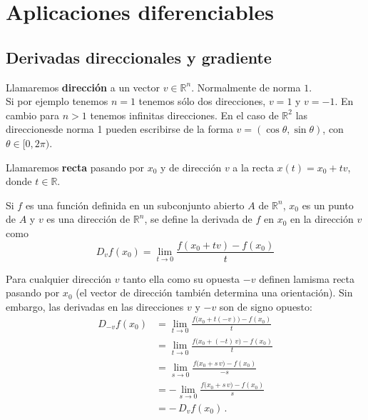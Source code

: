 \section{Aplicaciones diferenciables}
\subsection{Derivadas direccionales y gradiente}
\begin{definición}[Dirección]
    Llamaremos \textbf{dirección} a un vector $v\in\mathbb{R}^n$. Normalmente de norma $1$. \\
    Si por ejemplo tenemos $n = 1$ tenemos sólo dos direcciones, $v = 1$ y $v = -1$. En cambio para $n > 1$ tenemos infinitas direcciones. En el caso de $\mathbb{R}^2$ las direccionesde norma 1 pueden escribirse de la forma $v = (\cos\theta, \sin\theta)$, con $\theta\in[0,2\pi)$. \\
\end{definición}

\begin{definición}[Recta]
    Llamaremos \textbf{recta} pasando por $x_0$ y de dirección $v$ a la recta $x(t) = x_0 + tv$, donde $t\in\mathbb{R}$. 
\end{definición}

\begin{definición}
    Si $f$ es una función definida en un subconjunto abierto $A$ de $\mathbb{R}^n$, $x_0$ es un punto de $A$ y $v$ es una dirección de $\mathbb{R}^n$, se define la derivada de $f$ en $x_0$ en la dirección $v$ como
    $$ D_vf(x_0) = \lim_{t\to 0} \frac{f(x_0 + tv) - f(x_0)}{t} $$
\end{definición}
\begin{observación}
    Para cualquier dirección $v$ tanto ella como su opuesta $-v$ definen lamisma recta pasando por $x_0$ (el vector de dirección también determina una orientación). Sin embargo, las derivadas en las direcciones $v$ y $-v$ son de signo opuesto: 
    \begin{align*}
        D_{-v}f(x_{0})
        &= \lim_{t \to 0} \frac{f\bigl(x_{0} + t(-v)\bigr) - f(x_{0})}{t} \\
        &= \lim_{t \to 0} \frac{f\bigl(x_{0} + (-t)\,v\bigr) - f(x_{0})}{t} \\
        &= \lim_{s \to 0} \frac{f\bigl(x_{0} + s\,v\bigr) - f(x_{0})}{-s} \\
        &= - \lim_{s \to 0} \frac{f\bigl(x_{0} + s\,v\bigr) - f(x_{0})}{s} \\
        &= -\,D_{v}f(x_{0}) \,.
    \end{align*}
\end{observación}

